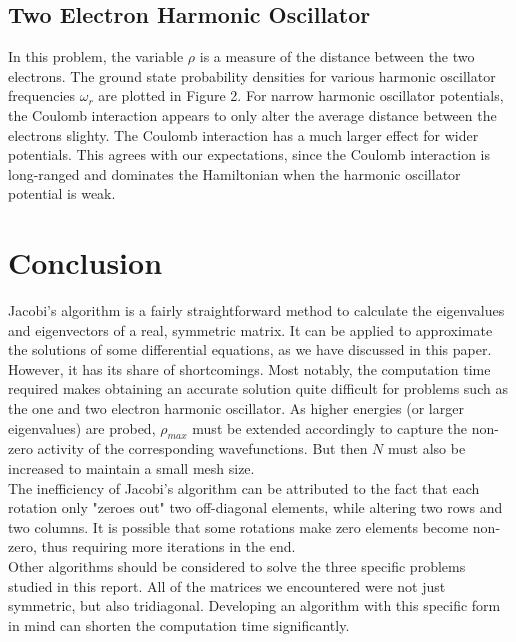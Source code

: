 \documentclass[prb,aps,twocolumn,showpacs,10pt]{revtex4-1}
\begin{document}
\subsection{Two Electron Harmonic Oscillator}

In this problem, the variable $\rho$ is a measure of the distance between the two electrons. The ground state probability densities for various harmonic oscillator frequencies $\omega_r$ are plotted in Figure 2. For narrow harmonic oscillator potentials, the Coulomb interaction appears to only alter the average distance between the electrons slighty. The Coulomb interaction has a much larger effect for wider potentials. This agrees with our expectations, since the Coulomb interaction is long-ranged and dominates the Hamiltonian when the harmonic oscillator potential is weak.

\section{Conclusion}

Jacobi's algorithm is a fairly straightforward method to calculate the eigenvalues and eigenvectors of a real, symmetric matrix. It can be applied to approximate the solutions of some differential equations, as we have discussed in this paper. However, it has its share of shortcomings. Most notably, the computation time required makes obtaining an accurate solution quite difficult for problems such as the one and two electron harmonic oscillator. As higher energies (or larger eigenvalues) are probed, $\rho_{max}$ must be extended accordingly to capture the non-zero activity of the corresponding wavefunctions. But then $N$ must also be increased to maintain a small mesh size.\\

The inefficiency of Jacobi's algorithm can be attributed to the fact that each rotation only "zeroes out" two off-diagonal elements, while altering two rows and two columns. It is possible that some rotations make zero elements become non-zero, thus requiring more iterations in the end.\\

Other algorithms should be considered to solve the three specific problems studied in this report. All of the matrices we encountered were not just symmetric, but also tridiagonal. Developing an algorithm with this specific form in mind can shorten the computation time significantly. \\
\end{document}
